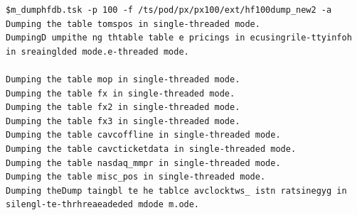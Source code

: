 \documentclass[8pt,]{article}
\begin{document}
\begin{verbatim}
$m_dumphfdb.tsk -p 100 -f /ts/pod/px/px100/ext/hf100dump_new2 -a
Dumping the table tomspos in single-threaded mode.
DumpingD umpithe ng thtable table e pricings in ecusingrile-ttyinfoh in sreainglded mode.e-threaded mode.

Dumping the table mop in single-threaded mode.
Dumping the table fx in single-threaded mode.
Dumping the table fx2 in single-threaded mode.
Dumping the table fx3 in single-threaded mode.
Dumping the table cavcoffline in single-threaded mode.
Dumping the table cavcticketdata in single-threaded mode.
Dumping the table nasdaq_mmpr in single-threaded mode.
Dumping the table misc_pos in single-threaded mode.
Dumping theDump taingbl te he tablce avclocktws_ istn ratsinegyg in silengl-te-thrhreaeadeded mdode m.ode.


\end{verbatim}
\end{document}
